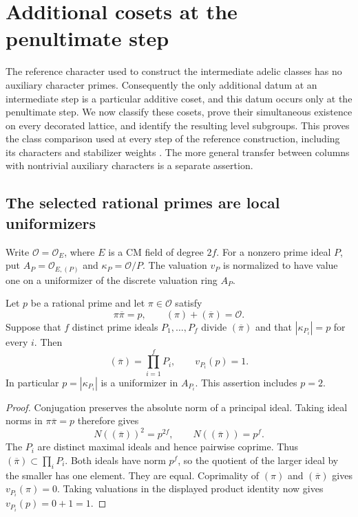 \section{Additional cosets at the penultimate step}
\label{acc-section}

The reference character used to construct the intermediate adelic
classes has no auxiliary character primes.  Consequently the only
additional datum at an intermediate step is a particular additive
coset, and this datum occurs only at the penultimate step.  We now
classify these cosets, prove their simultaneous existence on every
decorated lattice, and identify the resulting level subgroups.  This
proves the class comparison used at every step of the reference
construction, including its characters and stabilizer weights
\cite{alpo-uniform-source}.  The more general transfer between columns
with nontrivial auxiliary characters is a separate assertion.

\subsection{The selected rational primes are local uniformizers}

Write $\mathcal O=\mathcal O_E$, where $E$ is a CM field of degree
$2f$.  For a nonzero prime ideal $P$, put
$A_P=\mathcal O_{E,(P)}$ and $\kappa_P=\mathcal O/P$.
The valuation $v_P$ is normalized to have value one on a
uniformizer of the discrete valuation ring $A_P$.

\begin{lemma}\label{acc-uniformizer}
Let $p$ be a rational prime and let $\pi\in\mathcal O$ satisfy
\[
 \pi\overline\pi=p,\qquad (\pi)+(\overline\pi)=\mathcal O.
\]
Suppose that $f$ distinct prime ideals $P_1,\ldots,P_f$ divide
$(\overline\pi)$ and that $|\kappa_{P_i}|=p$ for every $i$.
Then
\[
 (\overline\pi)=\prod_{i=1}^f P_i,
 \qquad v_{P_i}(p)=1.
\]
In particular $p=|\kappa_{P_i}|$ is a uniformizer in $A_{P_i}$.
This assertion includes $p=2$.
\end{lemma}

\begin{proof}
Conjugation preserves the absolute norm of a principal ideal.
Taking ideal norms in $\pi\overline\pi=p$ therefore gives
\[
 N((\overline\pi))^2=p^{2f},
 \qquad N((\overline\pi))=p^f.
\]
The $P_i$ are distinct maximal ideals and hence pairwise coprime.
Thus $(\overline\pi)\subset\prod_iP_i$.
Both ideals have norm $p^f$, so the quotient of the larger ideal
by the smaller has one element.  They are equal.
Coprimality of $(\pi)$ and $(\overline\pi)$ gives
$v_{P_i}(\pi)=0$.  Taking valuations in the displayed product
identity now gives $v_{P_i}(p)=0+1=1$.
\end{proof}

